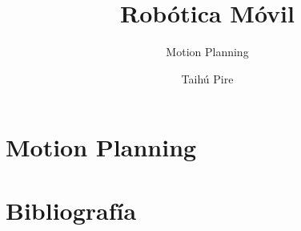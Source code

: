 \documentclass[aspectratio=169,compress]{beamer}
\subtitle{Motion Planning}
\title{Robótica Móvil}
\author{Taihú Pire}
\institute{}
\date{}
\begin{document}
	
	\frame{\titlepage}
	
	\section{Motion Planning}
	
	
	\section{Bibliografía}
	
	
\end{document}
